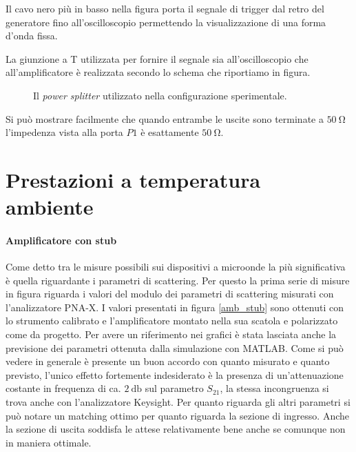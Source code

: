 \documentclass[12pt,oneside]{book}
\begin{document}
Il cavo nero più in basso nella figura porta il segnale di trigger dal retro del generatore fino all'oscilloscopio permettendo la visualizzazione di una forma d'onda fissa.

La giunzione a T utilizzata per fornire il segnale sia all'oscilloscopio che all'amplificatore è realizzata secondo lo schema che riportiamo in figura.

\begin{figure}[!htbp]
    \centering
        
        \caption{Il \textit{power splitter} utilizzato nella configurazione sperimentale.}
        \label{splitter_50}
\end{figure}

Si può mostrare facilmente che quando entrambe le uscite sono terminate a $\SI{50}{\ohm}$ l'impedenza vista alla porta $P1$ è esattamente $\SI{50}{\ohm}$.



\section{Prestazioni a temperatura ambiente}

\paragraph{Amplificatore con stub}

Come detto tra le misure possibili sui dispositivi a microonde la più significativa è quella riguardante i parametri di scattering. Per questo la prima serie di misure in figura riguarda i valori del modulo dei parametri di scattering misurati con l'analizzatore PNA-X. I valori presentati in figura \ref{amb_stub} sono ottenuti con lo strumento calibrato e l'amplificatore montato nella sua scatola e polarizzato come da progetto. Per avere un riferimento nei grafici è stata lasciata anche la previsione dei parametri ottenuta dalla simulazione con MATLAB. Come si può vedere in generale è presente un buon accordo con quanto misurato e quanto previsto, l'unico effetto fortemente indesiderato è la presenza di un'attenuazione costante in frequenza di ca. $\SI{2}{\decibel}$ sul parametro $S_{21}$, la stessa incongruenza si trova anche con l'analizzatore Keysight. Per quanto riguarda gli altri parametri si può notare un matching ottimo per quanto riguarda la sezione di ingresso. Anche la sezione di uscita soddisfa le attese relativamente bene anche se comunque non in maniera ottimale.
\end{document}
